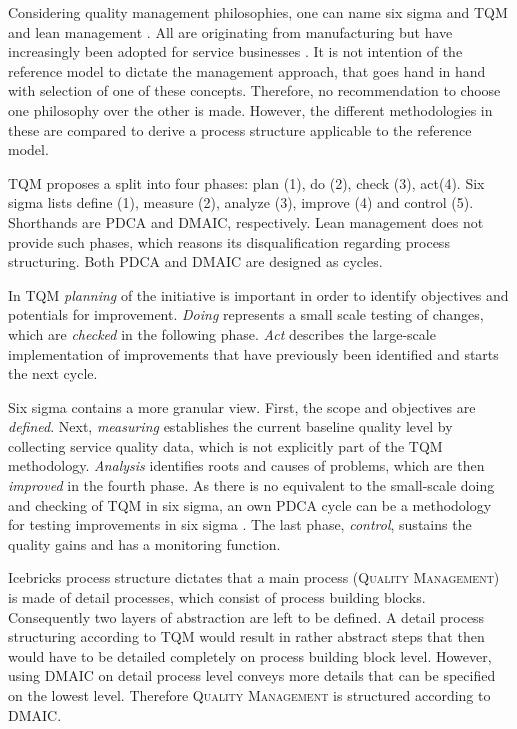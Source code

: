 	Considering quality management philosophies, one can name six sigma and \acrshort{TQM} and lean management \citep{Andersson_2006}. All are originating from manufacturing but have increasingly been adopted for service businesses \citep{Antony_2007}. It is not intention of the reference model to dictate the management approach, that goes hand in hand with selection of one of these concepts. Therefore, no recommendation to choose one philosophy over the other is made. However, the different methodologies in these are compared to derive a process structure applicable to the reference model. 
	
	\acrshort{TQM} proposes a split into four phases: plan (1), do (2), check (3), act(4). Six sigma lists define (1), measure (2), analyze (3), improve (4) and control (5). Shorthands are \acrshort{PDCA} and \acrshort{DMAIC}, respectively. Lean management does not provide such phases, which reasons its disqualification regarding process structuring. Both \acrshort{PDCA} and \acrshort{DMAIC} are designed as cycles. 
	
	In \acrshort{TQM} \textit{planning} of the initiative is important in order to identify objectives and potentials for improvement. \textit{Doing} represents a small scale testing of changes, which are \textit{checked} in the following phase. \textit{Act} describes the large-scale implementation of improvements that have previously been identified and starts the next cycle. 
	
	Six sigma contains a more granular view. First, the scope and objectives are \textit{defined}. Next, \textit{measuring} establishes the current baseline quality level by collecting service quality data, which is not explicitly part of the \acrshort{TQM} methodology. \textit{Analysis} identifies roots and causes of problems, which are then \textit{improved} in the fourth phase. As there is no equivalent to the small-scale doing and checking of \acrshort{TQM} in six sigma, an own \acrshort{PDCA} cycle can be a methodology for testing improvements in six sigma \citep{9780071840538}. The last phase, \textit{control}, sustains the quality gains and has a monitoring function.
	
	Icebricks process structure dictates that a main process (\textsc{Quality Management}) is made of detail processes, which consist of process building blocks. Consequently two layers of abstraction are left to be defined. A detail process structuring according to \acrshort{TQM} would result in rather abstract steps that then would have to be detailed completely on process building block level. However, using \acrshort{DMAIC} on detail process level conveys more details that can be specified on the lowest level. Therefore \textsc{Quality Management} is structured according to \acrshort{DMAIC}. 
	
